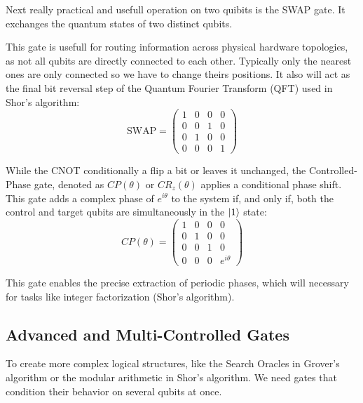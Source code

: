 %
%
Next really practical and usefull operation on two quibits is the SWAP gate. It exchanges the quantum states of two distinct qubits.
%
%

This gate is usefull for routing information across physical hardware topologies, 
as not all qubits are directly connected to each other. 
Typically only the nearest ones are only connected so we have to change theirs positions.
It also will act as the final bit reversal step of the Quantum Fourier Transform (QFT) used in Shor's algorithm:
\bigskip
\begin{equation}
    \text{SWAP} = \begin{pmatrix} 
    1 & 0 & 0 & 0 \\ 
    0 & 0 & 1 & 0 \\ 
    0 & 1 & 0 & 0 \\ 
    0 & 0 & 0 & 1 
    \end{pmatrix}
\end{equation}
\bigskip

While the CNOT conditionally a flip a bit or leaves it unchanged, 
the Controlled-Phase gate, denoted as $CP(\theta)$ or $CR_z(\theta)$ applies a conditional phase shift.
%
%
This gate adds a complex phase of $e^{i\theta}$ to the system if, and only if, 
both the control and target qubits are simultaneously in the $\ket{1}$ state:
%
%
\bigskip
\begin{equation}
    CP(\theta) = \begin{pmatrix} 
    1 & 0 & 0 & 0 \\ 
    0 & 1 & 0 & 0 \\ 
    0 & 0 & 1 & 0 \\ 
    0 & 0 & 0 & e^{i\theta} 
    \end{pmatrix}
\end{equation}
\bigskip

This gate enables the precise extraction of periodic phases, which will necessary for tasks like integer factorization (Shor's algorithm).
%
%

\subsection{Advanced and Multi-Controlled Gates}

To create more complex logical structures, like the Search Oracles in Grover's algorithm or 
the modular arithmetic in Shor's algorithm. We need gates that condition their behavior on several qubits at once.

